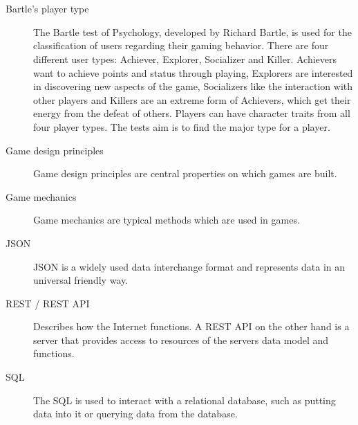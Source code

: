 \chapter*{\nameofglossary}


\begin{description}
	\item[Bartle's player type] The Bartle test of Psychology, developed by Richard Bartle, is used for the classification of users regarding their gaming behavior. There are four different user types: Achiever, Explorer, Socializer and Killer. Achievers want to achieve points and status through playing, Explorers are interested in discovering new aspects of the game, Socializers like the interaction with other players and Killers are an extreme form of Achievers, which get their energy from the defeat of others. Players can have character traits from all four player types. The tests aim is to find the major type for a player. \cite[p. 44, 45]{kumarGamificationWorkDesigning2013}
\end{description}

\begin{description}
	\item[Game design principles] Game design principles are central properties on which games are built. \cite[p. 8]{kumarGamificationWorkDesigning2013}
\end{description}

\begin{description}
	\item[Game mechanics] Game mechanics are typical methods which are used in games. \cite[p. 8]{kumarGamificationWorkDesigning2013}
	\item[JSON] \acl{JSON} is a widely used data interchange format and represents data in an universal friendly way. \cite[pp. 2-4]{bassettIntroductionJavaScriptObject2015}
	\item[REST / REST API] Describes how the Internet functions. A \acs{REST} \acs{API} on the other hand is a server that provides access to resources of the servers data model and functions. \cite[p. IX]{masseRESTAPIDesign2011}
	\item[SQL] The \acl{SQL} is used to interact with a relational database, such as putting data into it or querying data from the database. \cite[p. XIII]{molinaroSQLCookbookQuery2005}

\end{description}

